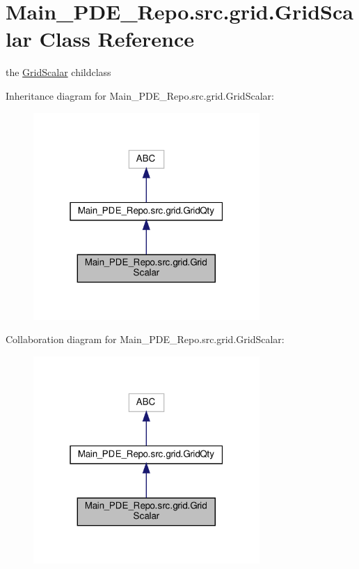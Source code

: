 \hypertarget{classMain__PDE__Repo_1_1src_1_1grid_1_1GridScalar}{}\section{Main\+\_\+\+P\+D\+E\+\_\+\+Repo.\+src.\+grid.\+Grid\+Scalar Class Reference}
\label{classMain__PDE__Repo_1_1src_1_1grid_1_1GridScalar}


the \hyperlink{classMain__PDE__Repo_1_1src_1_1grid_1_1GridScalar}{Grid\+Scalar} childclass  




Inheritance diagram for Main\+\_\+\+P\+D\+E\+\_\+\+Repo.\+src.\+grid.\+Grid\+Scalar\+:
\nopagebreak
\begin{figure}[H]
\begin{center}
\leavevmode
\includegraphics[width=244pt]{classMain__PDE__Repo_1_1src_1_1grid_1_1GridScalar__inherit__graph}
\end{center}
\end{figure}


Collaboration diagram for Main\+\_\+\+P\+D\+E\+\_\+\+Repo.\+src.\+grid.\+Grid\+Scalar\+:
\nopagebreak
\begin{figure}[H]
\begin{center}
\leavevmode
\includegraphics[width=244pt]{classMain__PDE__Repo_1_1src_1_1grid_1_1GridScalar__coll__graph}
\end{center}
\end{figure}
